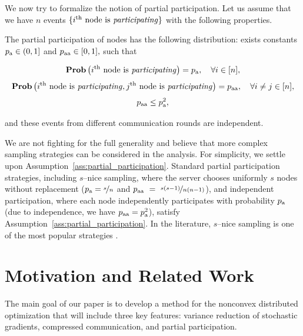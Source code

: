 \documentclass{article}
\newcommand*{\probavailable}{\ensuremath{p_{\textnormal{a}}}}
\newcommand*{\probpairaa}{\ensuremath{p_{\textnormal{aa}}}}
\begin{document}
We now try to formalize the notion of partial participation. Let us assume that we have $n$ events $\{i^{\textnormal{th}} \textnormal{ node is \textit{participating}}\}$ with the following properties.
\begin{assumption}
  \label{ass:partial_participation}
  The partial participation of nodes has the following distribution: exists constants $\probavailable \in (0, 1]$ and $\probpairaa \in [0, 1],$ such that
  \begin{enumerate}
    \Item \begin{align*}\Prob\left(i^{\textnormal{th}} \textnormal{ node is \textit{participating}}\right) = \probavailable, \quad \forall i \in [n],\end{align*}
    \Item \begin{align*}\Prob\left(i^{\textnormal{th}} \textnormal{ node is \textit{participating}}, j^{\textnormal{th}} \textnormal{ node is \textit{participating}}\right) = \probpairaa, \quad \forall i \neq j \in [n],\end{align*}
    \Item \begin{align} \label{eq:partial_participation_constraint}
      \probpairaa \leq \probavailable^2,
    \end{align}
  \end{enumerate}
  and these events from different communication rounds are independent.
\end{assumption}

We are not fighting for the full generality and believe that more complex sampling strategies can be considered in the analysis. For simplicity, we settle upon Assumption~\ref{ass:partial_participation}. Standard partial participation strategies, including $s$--nice sampling, where the server chooses uniformly $s$ nodes without replacement ($\probavailable = \nicefrac{s}{n}$ and $\probpairaa~=~\nicefrac{s(s-1)}{n(n-1)}$),
and independent participation, where each node independently participates with probability $\probavailable$ (due to independence, we have $\probpairaa = \probavailable^2$), satisfy Assumption~\ref{ass:partial_participation}. In the literature, $s$--nice sampling is one of the most popular strategies \citep{zhao2021faster, fatkhullin2021ef21, reddi2020adaptive, konevcny2016federated}. 

\section{Motivation and Related Work}
The main goal of our paper is to develop a method for the nonconvex distributed optimization that will include three key features: variance reduction of stochastic gradients, compressed communication, and partial participation.
\end{document}
